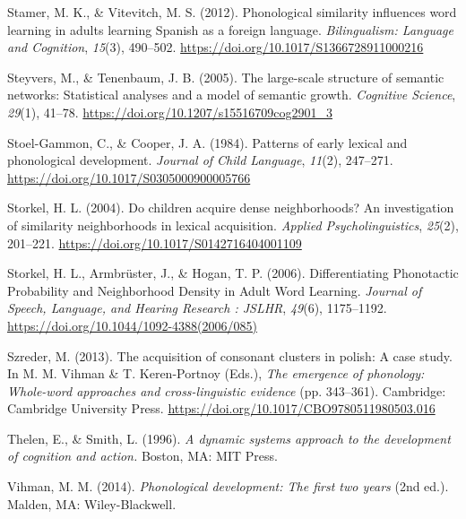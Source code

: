 \documentclass[
  man]{apa6}
\newlength{\cslhangindent}
\newlength{\cslentryspacingunit} %
\newenvironment{CSLReferences}[2] %
 {%
  \setlength{\parindent}{0pt}
  \ifodd #1
  \let\oldpar\par
  \def\par{\hangindent=\cslhangindent\oldpar}
  \fi
  \setlength{\parskip}{#2\cslentryspacingunit}
 }%
 {}
\begin{document}
\begin{CSLReferences}{1}{0}
\leavevmode{}%
Stamer, M. K., \& Vitevitch, M. S. (2012). Phonological similarity influences word learning in adults learning {Spanish} as a foreign language. \emph{Bilingualism: Language and Cognition}, \emph{15}(3), 490--502. \url{https://doi.org/10.1017/S1366728911000216}

\leavevmode{}%
Steyvers, M., \& Tenenbaum, J. B. (2005). The large-scale structure of semantic networks: Statistical analyses and a model of semantic growth. \emph{Cognitive Science}, \emph{29}(1), 41--78. \url{https://doi.org/10.1207/s15516709cog2901_3}

\leavevmode{}%
Stoel-Gammon, C., \& Cooper, J. A. (1984). Patterns of early lexical and phonological development. \emph{Journal of Child Language}, \emph{11}(2), 247--271. \url{https://doi.org/10.1017/S0305000900005766}

\leavevmode{}%
Storkel, H. L. (2004). Do children acquire dense neighborhoods? {An} investigation of similarity neighborhoods in lexical acquisition. \emph{Applied Psycholinguistics}, \emph{25}(2), 201--221. \url{https://doi.org/10.1017/S0142716404001109}

\leavevmode{}%
Storkel, H. L., Armbrüster, J., \& Hogan, T. P. (2006). Differentiating {Phonotactic} {Probability} and {Neighborhood} {Density} in {Adult} {Word} {Learning}. \emph{Journal of Speech, Language, and Hearing Research : JSLHR}, \emph{49}(6), 1175--1192. \url{https://doi.org/10.1044/1092-4388(2006/085)}

\leavevmode{}%
Szreder, M. (2013). The acquisition of consonant clusters in polish: A case study. In M. M. Vihman \& T. Keren-Portnoy (Eds.), \emph{The emergence of phonology: Whole-word approaches and cross-linguistic evidence} (pp. 343--361). Cambridge: Cambridge University Press. \url{https://doi.org/10.1017/CBO9780511980503.016}

\leavevmode{}%
Thelen, E., \& Smith, L. (1996). \emph{A dynamic systems approach to the development of cognition and action.} Boston, {MA}: {MIT} Press.

\leavevmode{}%
Vihman, M. M. (2014). \emph{Phonological development: The first two years} (2nd ed.). Malden, {MA}: Wiley-Blackwell.


\end{CSLReferences}
\end{document}
